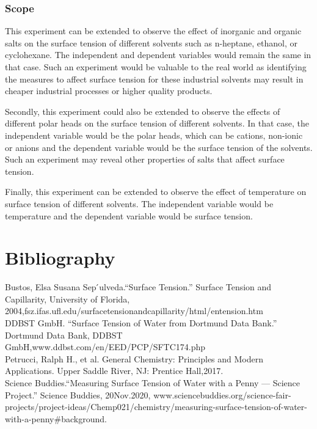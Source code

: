 \documentclass{article}
\begin{document}
\subsubsection{Scope}

\par{This experiment can be extended to observe the effect of inorganic and organic salts on the surface tension of different solvents such as n-heptane, ethanol, or cyclohexane. The independent and dependent variables would remain the same in that case. Such an experiment would be valuable to the real world as identifying the measures to affect surface tension for these industrial solvents may result in cheaper industrial processes or higher quality products.}

\par{Secondly, this experiment could also be extended to observe the effects of different polar heads on the surface tension of different solvents. In that case, the independent variable would be the polar heads, which can be cations, non-ionic or anions and the dependent variable would be the surface tension of the solvents. Such an experiment may reveal other properties of salts that affect surface tension.}

\par{Finally, this experiment can be extended to observe the effect of temperature on surface tension of different solvents. The independent variable would be temperature and the dependent variable would be surface tension.}

\pagebreak

\section{Bibliography}

\hspace{-1.3cm}
Bustos,  Elsa  Susana  Sep ́ulveda.“Surface  Tension.”  Surface  Tension  and  Capillarity,  University  of  Florida,  2004,fsz.ifas.ufl.edu/surfacetensionandcapillarity/html/entension.htm
\newline \\
DDBST  GmbH.  “Surface  Tension  of  Water  from  Dortmund  Data  Bank.”  Dortmund  Data  Bank,  DDBST  GmbH,www.ddbst.com/en/EED/PCP/SFTC174.php
\newline \\
Petrucci, Ralph H., et al.  General Chemistry:  Principles and Modern Applications.  Upper Saddle River, NJ: Prentice Hall,2017.
\newline \\
Science  Buddies.“Measuring  Surface  Tension  of  Water  with  a  Penny  —  Science  Project.”  Science  Buddies,   20Nov.2020,  www.sciencebuddies.org/science-fair-projects/project-ideas/Chemp021/chemistry/measuring-surface-tension-of-water-with-a-penny#background.
\end{document}
